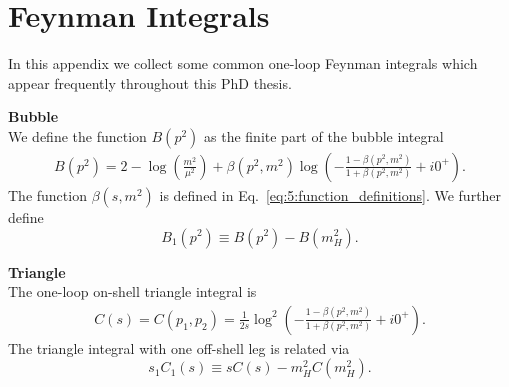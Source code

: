 

\chapter{Feynman Integrals}\label{app:2}

In this appendix we collect some common one-loop Feynman integrals which appear frequently throughout this PhD thesis.

\textbf{Bubble}\\
We define the function $B(p^2)$ as the finite part of the bubble integral
\begin{equation}
\begin{split}
B(p^2) = 2 - \log\!\left(\frac{m^2}{ \mu^2} \right) + \beta(p^2, m^2) \log\!\left( - \frac{1 - \beta(p^2, m^2)}{1 + \beta(p^2, m^2)} + i0^+ \right).
\end{split}
\end{equation}
The function $\beta(s, m^2)$ is defined in Eq.~\eqref{eq:5:function_definitions}. We further define
\begin{equation}
B_1(p^2) \equiv B(p^2) - B(m_H^2).
\end{equation}

\textbf{Triangle} \\
The one-loop on-shell triangle integral is
\begin{equation}
\begin{split}
C(s) = C(p_1, p_2) = \frac{1}{2 s} \log^2\!\left( - \frac{1 - \beta(p^2, m^2)}{1 + \beta(p^2, m^2)} + i0^+ \right).
\end{split}
\end{equation}
The triangle integral with one off-shell leg is related via
\begin{equation}
s_1 C_1(s) \equiv s C(s) - m_H^2 C(m_H^2).
\end{equation}


